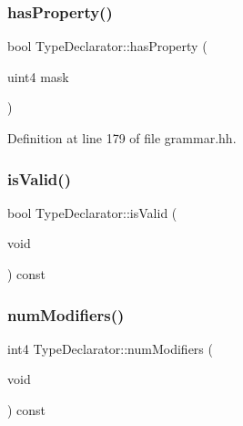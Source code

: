 \mbox{\label{class_type_declarator_a8db10df0a41685b9a392988d61598bfd}} 
\subsubsection{\texorpdfstring{hasProperty()}{hasProperty()}}
{\footnotesize\ttfamily bool Type\+Declarator\+::has\+Property (\begin{DoxyParamCaption}\item[{uint4}]{mask }\end{DoxyParamCaption})\hspace{0.3cm}{\ttfamily [inline]}}



Definition at line 179 of file grammar.\+hh.

\mbox{\label{class_type_declarator_a504d55c927b65ed9fa0a5593d068af9c}} 
\subsubsection{\texorpdfstring{isValid()}{isValid()}}
{\footnotesize\ttfamily bool Type\+Declarator\+::is\+Valid (\begin{DoxyParamCaption}\item[{void}]{ }\end{DoxyParamCaption}) const}

\mbox{\label{class_type_declarator_a4db93bcc2f88846c200f393cd3847077}} 
\subsubsection{\texorpdfstring{numModifiers()}{numModifiers()}}
{\footnotesize\ttfamily int4 Type\+Declarator\+::num\+Modifiers (\begin{DoxyParamCaption}\item[{void}]{ }\end{DoxyParamCaption}) const\hspace{0.3cm}{\ttfamily [inline]}}



